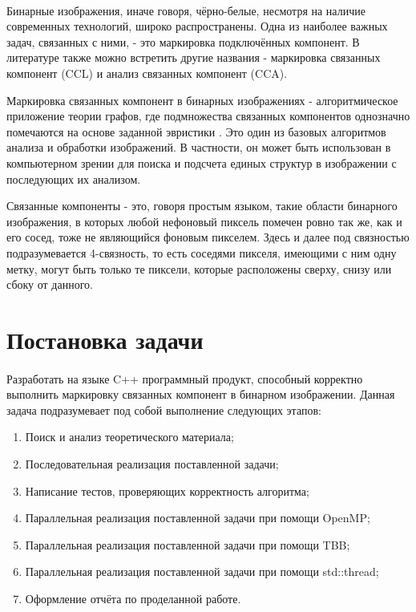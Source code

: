 \documentclass[14pt]{extarticle}
\begin{document}
\paragraph{} Бинарные изображения, иначе говоря, чёрно-белые, несмотря на наличие современных технологий, широко распространены. Одна из наиболее важных задач, связанных с ними, - это маркировка подключённых компонент. В литературе также можно встретить другие названия - маркировка связанных компонент (CCL) и анализ связанных компонент (CCA).
\par Маркировка связанных компонент в бинарных изображениях - алгоритмическое приложение теории графов, где подмножества связанных компонентов однозначно помечаются на основе заданной эвристики . Это один из базовых алгоритмов анализа и обработки изображений. В частности, он может быть использован в компьютерном зрении для поиска и подсчета единых структур в изображении с последующих их анализом.
\par Связанные компоненты - это, говоря простым языком, такие области бинарного изображения, в которых любой нефоновый пиксель помечен ровно так же, как и его сосед, тоже не являющийся фоновым пикселем. Здесь и далее под связностью подразумевается 4-связность, то есть соседями пикселя, имеющими с ним одну метку, могут быть только те пиксели, которые расположены сверху, снизу или сбоку от данного.
\newpage
\section{Постановка задачи}
\paragraph{} Разработать на языке C++ программный продукт, способный корректно выполнить маркировку связанных компонент в бинарном изображении. Данная задача подразумевает под собой выполнение следующих этапов:
\begin{enumerate}
    \item Поиск и анализ теоретического материала;
    \item Последовательная реализация поставленной задачи;
    \item Написание тестов, проверяющих корректность алгоритма;
    \item Параллельная реализация поставленной задачи при помощи OpenMP;
    \item Параллельная реализация поставленной задачи при помощи TBB;
    \item Параллельная реализация поставленной задачи при помощи std::thread;
    \item Оформление отчёта по проделанной работе.
\end{enumerate}
\newpage
\end{document}
